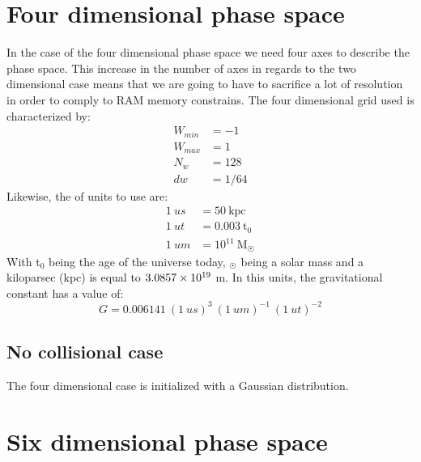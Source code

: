 \section{Four dimensional phase space}
In the case of the four dimensional phase space we need four axes to describe the phase space. This increase in the number of axes in regards to the two dimensional case means that we are going to have to sacrifice a lot of resolution in order to comply to RAM memory constrains. The four dimensional grid used is characterized by:
\begin{align}
W_{min} &= -1\\
W_{max} &= 1\\
N_w &= 128\\
dw &= 1/64
\end{align}
Likewise, the of units to use are:
\begin{align}
1\ us &= 50\ \text{kpc}\\
1\ ut &= 0.003 \ \text{t}_0\\
1\ um &= 10^{11} \ \text{M}_{\astrosun}
\end{align}
With t$_0$ being the age of the universe today, $_{\astrosun}$ being a solar mass and a kiloparsec (kpc) is equal to $3.0857\times 10^{19}$ m. In this units, the gravitational constant has a value of:
\begin{equation}
G = 0.006141 \ (1 \ us)^3 \ (1 \ um)^{-1} \ (1 \ ut)^{-2}
\end{equation}
\subsection{No collisional case}
The four dimensional case is initialized with a Gaussian distribution.














\newpage
\section{Six dimensional phase space}










